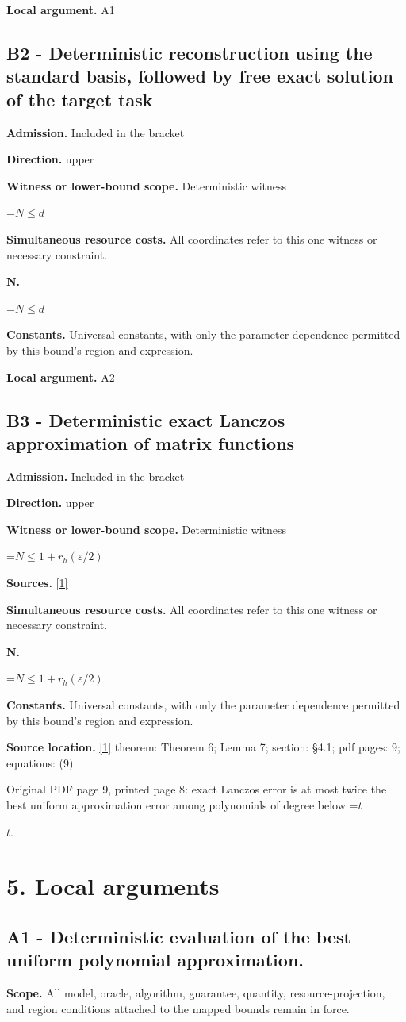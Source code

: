 \documentclass[10pt,a4paper]{article}
\newcommand{\AtlasMath}[1]{\par\begingroup\centering\setbox0=\hbox{$\displaystyle #1$}\ifdim\wd0>1.4\linewidth\typeout{ATLAS WIDE FORMULA: \the\wd0}\fi\ifdim\wd0>\linewidth\resizebox{\linewidth}{!}{\box0}\else\box0\fi\par\endgroup}
\newcommand{\AtlasInlineMath}[1]{\begingroup\setbox0=\hbox{$#1$}\ifdim\wd0>.4\linewidth\endgroup\AtlasMath{#1}\else\endgroup$#1$\fi}
\begin{document}
\textbf{Local argument.} A1

\subsection{B2 - Deterministic reconstruction using the standard basis, followed by free exact solution of the target task}
\textbf{Admission.} Included in the bracket

\textbf{Direction.} upper

\textbf{Witness or lower-bound scope.} Deterministic witness

\AtlasMath{N\le d}
\textbf{Simultaneous resource costs.} All coordinates refer to this one witness or necessary constraint.

\textbf{N.}

\AtlasMath{N\le d}
\textbf{Constants.} Universal constants, with only the parameter dependence permitted by this bound’s region and expression.

\textbf{Local argument.} A2

\subsection{B3 - Deterministic exact Lanczos approximation of matrix functions}
\textbf{Admission.} Included in the bracket

\textbf{Direction.} upper

\textbf{Witness or lower-bound scope.} Deterministic witness

\AtlasMath{N\le1+r_h(\varepsilon/2)}
\textbf{Sources.} \href{https://arxiv.org/pdf/1708.07788v2}{[1]}

\textbf{Simultaneous resource costs.} All coordinates refer to this one witness or necessary constraint.

\textbf{N.}

\AtlasMath{N\le1+r_h(\varepsilon/2)}
\textbf{Constants.} Universal constants, with only the parameter dependence permitted by this bound’s region and expression.

\textbf{Source location.} \href{https://arxiv.org/pdf/1708.07788v2}{[1]} theorem: Theorem 6; Lemma 7; section: §4.1; pdf pages: 9; equations: (9)

Original PDF page 9, printed page 8: exact Lanczos error is at most twice the best uniform approximation error among polynomials of degree below \AtlasInlineMath{t}.

\section{5. Local arguments}
\subsection{A1 - Deterministic evaluation of the best uniform polynomial approximation.}
\textbf{Scope.} All model, oracle, algorithm, guarantee, quantity, resource-projection, and region conditions attached to the mapped bounds remain in force.
\end{document}
